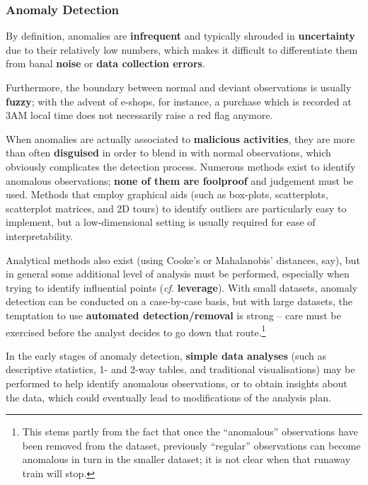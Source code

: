 \subsubsection*{Anomaly Detection}
By definition, anomalies are \textbf{infrequent} and typically shrouded in \textbf{uncertainty} due to their relatively low numbers, which makes it difficult to differentiate them from banal \textbf{noise} or \textbf{data collection errors}. \par Furthermore, the boundary between normal and deviant observations is usually \textbf{fuzzy}; with the advent of e-shops, for instance, a purchase which is recorded at 3AM local time does not necessarily raise a red flag anymore. \par When anomalies are actually associated to \textbf{malicious activities}, they are more than often \textbf{disguised} in order to blend in with normal observations, which obviously complicates the detection process.
\newl
Numerous methods exist to identify anomalous observations; \textbf{none of them are foolproof} and judgement must be used. Methods that employ graphical aids (such as box-plots, scatterplots, scatterplot matrices, and 2D tours) to identify outliers are particularly easy to implement, but a low-dimensional setting is usually required for ease of interpretability. \par Analytical methods also exist (using Cooke's or Mahalanobis' distances, say), but in general some additional level of analysis must be performed, especially when trying to identify influential points (\textit{cf.} \textbf{leverage}). 
\newl With small datasets, anomaly detection can be conducted on a case-by-case basis, but with large datasets, the temptation to use \textbf{automated detection/removal} is strong -- care must be exercised before the analyst decides to go down that route.\footnote{This stems partly from the fact that once the ``anomalous'' observations have been removed from the dataset, previously ``regular'' observations can become anomalous in turn in the smaller dataset; it is not clear when that runaway train will stop.}\par
In the early stages of anomaly detection, \textbf{simple data analyses} (such as descriptive statistics, 1- and 2-way tables, and  traditional visualisations) may be performed to help identify anomalous observations, or to obtain insights about the data, which could eventually lead to modifications of the analysis plan.
